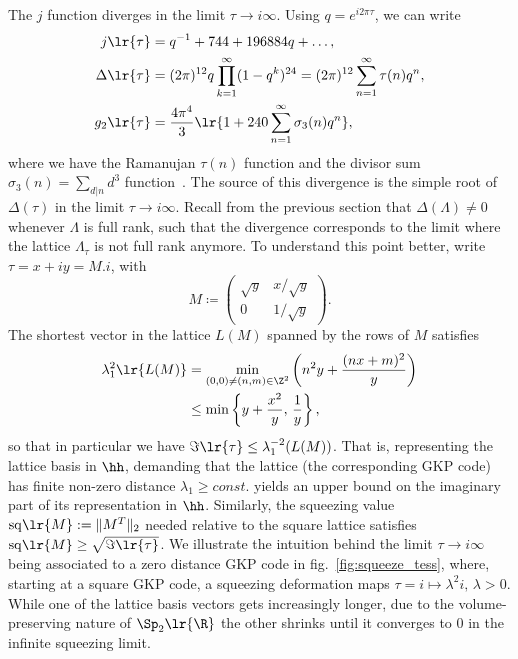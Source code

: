 \documentclass[a4paper, aps, pra, 11pt, onecolumn, tightenlines, superscriptaddress]{revtex4-2}
\begin{document}
The $j$ function diverges in the limit $\tau\rightarrow i\infty$. 
Using $q=e^{i2\pi \tau}$, we can write
\begin{align}
j\lr{\tau}&=q^{-1}+744+196884q + \hdots,\\
\Delta\lr{\tau}&=(2\pi)^{12}q\prod_{k=1}^{\infty}(1-q^k)^{24}=(2\pi)^{12}\sum_{n=1}^{\infty} \tau(n)q^n,\\
g_2\lr{\tau}&=\frac{4\pi^4}{3}\lr{1+240\sum_{n=1}^{\infty}\sigma_3(n)q^n},
\end{align}
where we have the Ramanujan $\tau(n)$ function and the divisor sum $\sigma_3(n)=\sum_{d|n}d^3$ function~\cite[Sec.~2]{Zagier2008}. The source of this divergence is the simple root of $\Delta(\tau)$ in the limit $\tau\rightarrow i\infty$. 
Recall from the previous section that $\Delta(\Lambda)\neq0$ whenever $\Lambda$ is full rank, such that the divergence corresponds to the limit where the lattice $\Lambda_{\tau}$ is not full rank anymore. To understand this point better, write $\tau=x+iy=M.i$, with
\begin{equation}
M\coloneqq\begin{pmatrix}
\sqrt{y} & x/\sqrt{y} \\ 0 &1/\sqrt{y}
\end{pmatrix}.
\end{equation}
The shortest vector in the lattice $L(M)$ spanned by the rows of $M$ satisfies
\begin{align}
\lambda_1^2\lr{L(M)} &=\min_{(0,0)\neq(n, m) \in \Z^2} \left(n^2y+\frac{(nx+m)^2}{y}\right) \nonumber\\&\leq \min\left\{y+\frac{x^2}{y},\, \frac{1}{y}\right\},
\end{align}
so that in particular we have $\Im\lr{\tau}\leq\lambda_1^{-2}(L(M))$. 
That is, representing the lattice basis in $\hh$, demanding that the lattice (the corresponding GKP code) has finite non-zero distance $\lambda_1\geq const.$ yields an upper bound on the imaginary part of its representation in $\hh$. 
Similarly, the squeezing value ${\rm sq}\lr{M}:=\|M^T\|_2$ needed relative to the square lattice satisfies ${\rm sq}\lr{M}\geq \sqrt{\Im\lr{\tau}}$. 
We illustrate the intuition behind the limit $\tau\rightarrow i\infty$ being associated to a zero distance GKP code in fig.~\ref{fig:squeeze_tess}, where, starting at a square GKP code, a squeezing deformation maps $\tau=i\mapsto \lambda^2i,\, \lambda>0$. 
While one of the lattice basis vectors gets increasingly longer, due to the volume-preserving nature of $\Sp_2\lr{\R}$ the other shrinks until it converges to $0$ in the infinite squeezing limit. 
\end{document}
